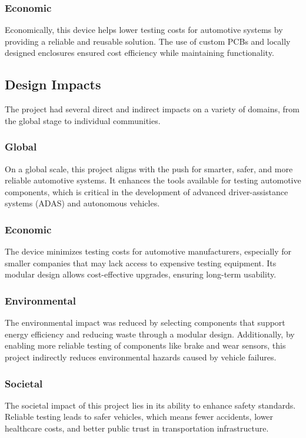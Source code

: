 \documentclass[12pt]{article}
\begin{document}
\subsubsection{Economic}
Economically, this device helps lower testing costs for automotive systems by
providing a reliable and reusable solution. The use of custom PCBs and locally
designed enclosures ensured cost efficiency while maintaining functionality.

\subsection{Design Impacts}
The project had several direct and indirect impacts on a variety of domains,
from the global stage to individual communities.

\subsubsection{Global}
On a global scale, this project aligns with the push for smarter, safer, and
more reliable automotive systems. It enhances the tools available for testing
automotive components, which is critical in the development of advanced
driver-assistance systems (ADAS) and autonomous vehicles.

\subsubsection{Economic}
The device minimizes testing costs for automotive manufacturers, especially for
smaller companies that may lack access to expensive testing equipment. Its
modular design allows cost-effective upgrades, ensuring long-term usability.


\subsubsection{Environmental}
The environmental impact was reduced by selecting components that support
energy efficiency and reducing waste through a modular design. Additionally, by
enabling more reliable testing of components like brake and wear sensors, this
project indirectly reduces environmental hazards caused by vehicle failures.


\subsubsection{Societal}
The societal impact of this project lies in its ability to enhance safety
standards. Reliable testing leads to safer vehicles, which means fewer
accidents, lower healthcare costs, and better public trust in transportation
infrastructure.
\end{document}

